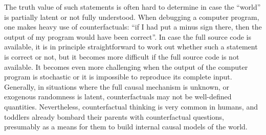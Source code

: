 The truth value of such statements is often hard to determine in case the ``world'' is partially latent or not
fully understood. When debugging a computer program, one makes heavy use of counterfactuals: ``if I had put a minus sign
there, then the output of my program would have been correct''. In case the full source code is available, it is in 
principle straightforward to work out whether such a statement is correct or not, but it becomes more difficult if 
the full source code is not available. It becomes even more challenging when the output of the computer program is
stochastic or it is impossible to reproduce its complete input. 
Generally, in situations where the full causal mechanism is unknown, or exogenous
randomness is latent, counterfactuals may not be well-defined quantities. Nevertheless, counterfactual thinking is 
very common in humans, and toddlers already bombard their parents with counterfactual questions, 
presumably as a means for them to build internal causal models of the world.

